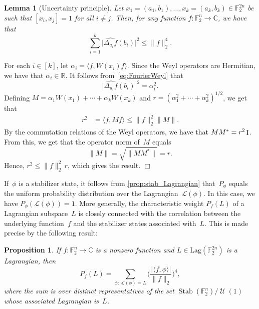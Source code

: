 \documentclass[11pt]{amsart}
\newcommand{\Lag}{\mathrm{Lag}}
\DeclareMathOperator{\Stab}{Stab}\DeclareMathOperator{\Spec}{Spec}
\newcommand{\R}{\mathbb{R}} %
\newcommand{\C}{\mathbb{C}} %
\newcommand{\F}{\mathbb{F}} %
\newcommand{\Lcal}{\mathcal{L}}
\newcommand{\Id}{\ensuremath{\mathop{\rm I}\nolimits}}
\DeclareMathOperator{\U}{\mathcal{U}}
\theoremstyle{plain}
\newtheorem{lemma}[theorem]{Lemma}
\newtheorem{proposition}[theorem]{Proposition}
\theoremstyle{definition}
\theoremstyle{remark}
\renewenvironment{proof}[1][]{
    	\begin{trivlist}
     	\item[\hspace{\labelsep}{\em\noindent Proof#1:\/}]}
     	{{\hfill$\Box$}
    	\end{trivlist}
  }
\begin{document}
\begin{lemma}[Uncertainty principle]\label{lem:uncertainty1}
Let $x_1 = (a_1,b_1),\dots,x_k = (a_k,b_k)\in \F_2^{2n}$ be such that $[x_i,x_j]=1$ for all $i\ne j$.
Then, for any function $f:\F_2^n\to \C$, we have that
\begin{equation*}
    \sum_{i=1}^k\big|\widehat{\Delta_{a_i}f}(b_i)\big|^2\leq \|f\|_2^4.
\end{equation*}
\end{lemma}

\begin{proof}
    For each $i\in [k]$, let $\alpha_i = \langle f,W(x_i)f\rangle$. Since the Weyl operators are Hermitian, we have that $\alpha_i\in \R$.
    It follows from~\eqref{eq:FourierWeyl} that
    $$
    \big|\widehat{\Delta_{a_i}f}(b_i)\big|^2 = \alpha_i^2.$$
    Defining $M = \alpha_1W(x_1) + \cdots +\alpha_kW(x_k)$ and $r = (\alpha_1^2 + \cdots + \alpha_k^2)^{1/2}$, we get that
    \begin{align*}
        r^2 &= \langle f, Mf\rangle\leq \|f\|_2^2\|M\|.
    \end{align*}
    By the commutation relations of the Weyl operators, we have that
    $MM^* = r^2\Id$.
    From this, we get that the operator norm of~$M$ equals
    $$
    \|M\| = \sqrt{\|MM^*\|} = r.$$
    Hence, $r^2\leq \|f\|_2^2\, r$, which gives the result.
\end{proof}

If~$\phi$ is a stabilizer state, it follows from \cref{prop:stab_Lagrangian} that~$P_\phi$ equals the uniform probability distribution over the Lagrangian~$\Lcal(\phi)$.
In this case, we have $P_\phi(\Lcal(\phi)) = 1$.
More generally, the characteristic weight $P_f(L)$ of a Lagrangian subspace~$L$ is closely connected with the correlation between the underlying function~$f$ and the stabilizer states associated with~$L$.
This is made precise by the following result:

\begin{proposition}
    If $f: \F_2^n \to \C$ is a nonzero function and $L\in \Lag(\F_2^{2n})$ is a Lagrangian, then
    \begin{equation} \label{eq:Pf_L4}
        P_f(L) = \sum_{\phi:\: \Lcal(\phi)=L} \bigg(\frac{|\langle f, \phi\rangle|}{\|f\|_2}\bigg)^4,
    \end{equation}
    where the sum is over distinct representatives of the set $\Stab(\F_2^n)/\U(1)$ whose associated Lagrangian is~$L$.
\end{proposition}
\end{document}
